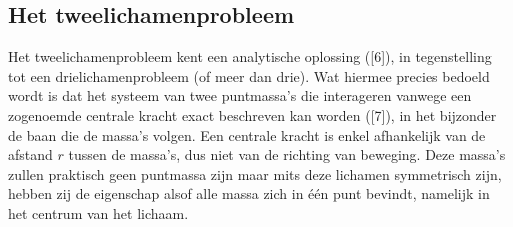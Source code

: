 \documentclass[a4paper]{article}
\begin{document}
	 \subsection{Het tweelichamenprobleem}
	 	Het tweelichamenprobleem kent een analytische oplossing ([6]), in tegenstelling tot een drielichamenprobleem (of meer dan drie). Wat hiermee precies bedoeld wordt is dat het systeem van twee puntmassa's die interageren vanwege een zogenoemde centrale kracht exact beschreven kan worden ([7]), in het bijzonder de baan die de massa's volgen. Een centrale kracht is enkel afhankelijk van de afstand $r$ tussen de massa's, dus niet van de richting van beweging. Deze massa's zullen praktisch geen puntmassa zijn maar mits deze lichamen symmetrisch zijn, hebben zij de eigenschap alsof alle massa zich in \'{e}\'{e}n punt bevindt, namelijk in het centrum van het lichaam.\\
	 	
\end{document}
